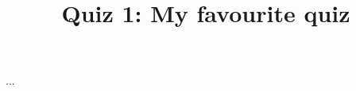 \documentclass{mathquiz}
\title{Quiz 1: My favourite quiz}
\begin{document}
  \begin{question}%
  \end{question}

  \begin{question}%
  \end{question}

  \begin{question}%
  \end{question}

  ...
\end{document}
